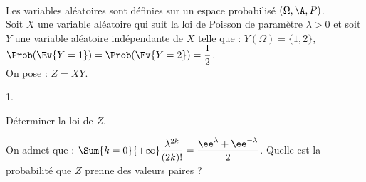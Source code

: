 \documentclass[11pt]{article}%
\begin{document}
\begin{exerciceSP}~\\
  Les variables aléatoires sont définies sur un espace probabilisé
  $(\Omega,\A,P)$.\\
  Soit $X$ une variable aléatoire qui suit la loi de Poisson de
  paramètre $\lambda>0$ et soit $Y$ une variable aléatoire
  indépendante de $X$ telle que : $Y(\Omega) = \{1, 2\}$,
  $\Prob(\Ev{Y=1}) = \Prob(\Ev{Y=2}) = \dfrac{1}{2}$.\\
  On pose : $Z = XY$.
  \begin{noliste}{1.}
    \setlength{\itemsep}{2mm}
  \item Déterminer la loi de $Z$.
  \item On admet que : $\Sum{k=0}{+\infty} \dfrac{\lambda^{2k}}{(2k)!}
    = \dfrac{\ee^{\lambda}+\ee^{-\lambda}}{2}$. Quelle est la
    probabilité que $Z$ prenne des valeurs paires ?
  \end{noliste}
\end{exerciceSP}




\end{document}
